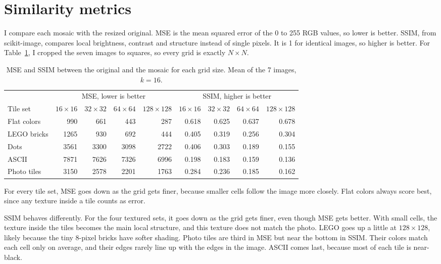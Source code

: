 \documentclass[10pt]{article}
\begin{document}
\section{Similarity metrics}
I compare each mosaic with the resized original. MSE is the mean squared error of the 0 to 255 RGB values, so lower is better. SSIM, from scikit-image, compares local brightness, contrast and structure instead of single pixels. It is 1 for identical images, so higher is better. For Table~\ref{tab:sim}, I cropped the seven images to squares, so every grid is exactly $N \times N$.

\begin{table}[!htb]
  \centering
  \caption{MSE and SSIM between the original and the mosaic for each grid size. Mean of the 7 images, $k = 16$.}
  \label{tab:sim}
  \small
  \begin{tabular}{l rrrr rrrr}
    \toprule
    & \multicolumn{4}{c}{MSE, lower is better} & \multicolumn{4}{c}{SSIM, higher is better} \\
    \cmidrule(lr){2-5} \cmidrule(lr){6-9}
    Tile set & $16 \times 16$ & $32 \times 32$ & $64 \times 64$ & $128 \times 128$ & $16 \times 16$ & $32 \times 32$ & $64 \times 64$ & $128 \times 128$ \\
    \midrule
    Flat colors & 990  & 661  & 443  & 287  & 0.618 & 0.625 & 0.637 & 0.678 \\
    LEGO bricks & 1265 & 930  & 692  & 444  & 0.405 & 0.319 & 0.256 & 0.304 \\
    Dots        & 3561 & 3300 & 3098 & 2722 & 0.406 & 0.303 & 0.189 & 0.155 \\
    ASCII       & 7871 & 7626 & 7326 & 6996 & 0.198 & 0.183 & 0.159 & 0.136 \\
    Photo tiles & 3150 & 2578 & 2201 & 1763 & 0.284 & 0.236 & 0.185 & 0.162 \\
    \bottomrule
  \end{tabular}
\end{table}

For every tile set, MSE goes down as the grid gets finer, because smaller cells follow the image more closely. Flat colors always score best, since any texture inside a tile counts as error.

SSIM behaves differently. For the four textured sets, it goes down as the grid gets finer, even though MSE gets better. With small cells, the texture inside the tiles becomes the main local structure, and this texture does not match the photo. LEGO goes up a little at $128 \times 128$, likely because the tiny 8-pixel bricks have softer shading. Photo tiles are third in MSE but near the bottom in SSIM. Their colors match each cell only on average, and their edges rarely line up with the edges in the image. ASCII comes last, because most of each tile is near-black.
\end{document}
